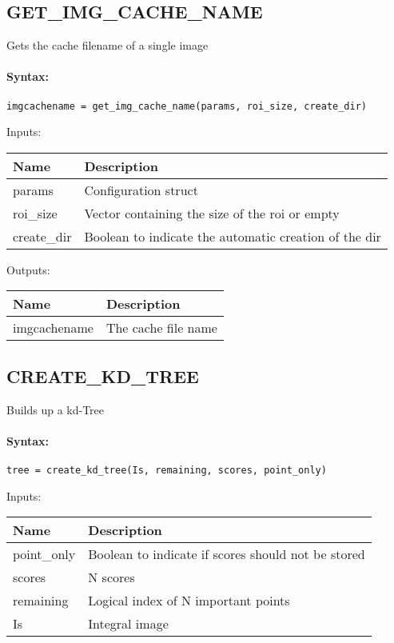 \subsection{GET\_IMG\_CACHE\_NAME}

Gets the cache filename of a single image

\paragraph{Syntax:} \verb|imgcachename = get_img_cache_name(params, roi_size, create_dir)|

\bigskip
Inputs:

\begin{tabular}{|p{}|p{}|}
\hline
\textbf{Name} & \textbf{Description} \\
\hline \hline
params & Configuration struct  \\ \hline
roi\_size & Vector containing the size of the roi or empty  \\ \hline
create\_dir & Boolean to indicate the automatic creation of the dir  \\ \hline
\end{tabular}

\bigskip
Outputs:

\begin{tabular}{|p{}|p{}|}
\hline
\textbf{Name} & \textbf{Description} \\
\hline \hline
imgcachename & The cache file name  \\ \hline
\end{tabular}

\subsection{CREATE\_KD\_TREE}

Builds up a kd-Tree

\paragraph{Syntax:} \verb|tree = create_kd_tree(Is, remaining, scores, point_only)|

\bigskip
Inputs:

\begin{tabular}{|p{}|p{}|}
\hline
\textbf{Name} & \textbf{Description} \\
\hline \hline
point\_only & Boolean to indicate if scores should not be stored  \\ \hline
scores & N scores  \\ \hline
remaining & Logical index of N important points  \\ \hline
Is & Integral image  \\ \hline
\end{tabular}


